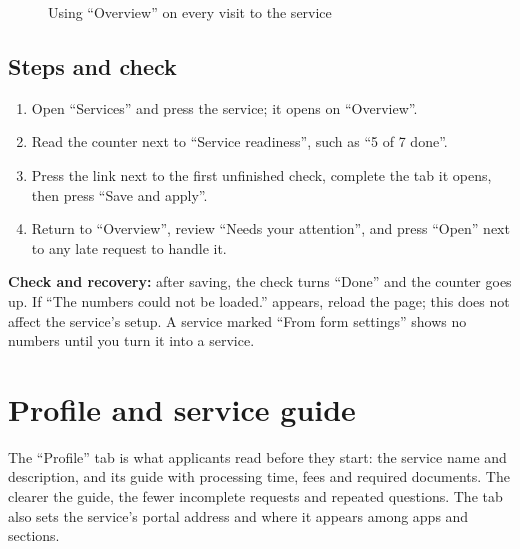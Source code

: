 \begin{figure}[H]
\centering
{}
\rclegend
\caption{Using “Overview” on every visit to the service}
\label{fig:builder-services-overview-flow}
\end{figure}

\subsection{Steps and check}
\begin{enumerate}
\item Open “Services” and press the service; it opens on “Overview”.
\item Read the counter next to “Service readiness”, such as “5 of 7 done”.
\item Press the link next to the first unfinished check, complete the tab it opens, then press “Save and apply”.
\item Return to “Overview”, review “Needs your attention”, and press “Open” next to any late request to handle it.
\end{enumerate}

\textbf{Check and recovery:} after saving, the check turns “Done” and the counter goes up. If “The numbers could not be loaded.” appears, reload the page; this does not affect the service's setup. A service marked “From form settings” shows no numbers until you turn it into a service.

\clearpage
\section{Profile and service guide}
\label{sec:builder-feature-services-profile}

The “Profile” tab is what applicants read before they start: the service name and description, and its guide with processing time, fees and required documents. The clearer the guide, the fewer incomplete requests and repeated questions. The tab also sets the service's portal address and where it appears among apps and sections.

